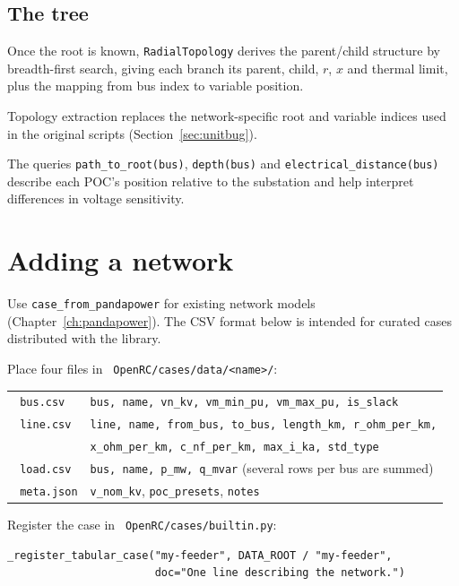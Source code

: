 \documentclass[11pt,a4paper]{report}
\newcommand{\why}[1]{\par\medskip\begingroup\noindent #1\par\endgroup\medskip}
\newcommand{\code}[1]{\texttt{\small #1}}
\newcommand{\file}[1]{\texttt{\small\color{nbgrey} #1}}
\begin{document}
\subsection{The tree}

Once the root is known, \code{RadialTopology} derives the parent/child structure
by breadth-first search, giving each branch its parent, child, $r$, $x$ and
thermal limit, plus the mapping from bus index to variable position.

\why{Topology extraction replaces the network-specific root and variable
indices used in the original scripts (Section~\ref{sec:unitbug}).}

The queries \code{path\_to\_root(bus)}, \code{depth(bus)} and
\code{electrical\_distance(bus)} describe each POC's position relative to the
substation and help interpret differences in voltage sensitivity.

\section{Adding a network}

Use \code{case\_from\_pandapower} for existing network models
(Chapter~\ref{ch:pandapower}). The CSV format below is intended for curated
cases distributed with the library.

Place four files in \file{OpenRC/cases/data/<name>/}:

\begin{center}\small
\begin{tabular}{@{}ll@{}}
\toprule
\file{bus.csv}  & \code{bus, name, vn\_kv, vm\_min\_pu, vm\_max\_pu, is\_slack} \\
\file{line.csv} & \code{line, name, from\_bus, to\_bus, length\_km, r\_ohm\_per\_km,} \\
                & \code{x\_ohm\_per\_km, c\_nf\_per\_km, max\_i\_ka, std\_type} \\
\file{load.csv} & \code{bus, name, p\_mw, q\_mvar} (several rows per bus are summed) \\
\file{meta.json}& \code{v\_nom\_kv}, \code{poc\_presets}, \code{notes} \\
\bottomrule
\end{tabular}
\end{center}

Register the case in \file{OpenRC/cases/builtin.py}:

\begin{lstlisting}
_register_tabular_case("my-feeder", DATA_ROOT / "my-feeder",
                       doc="One line describing the network.")
\end{lstlisting}
\end{document}
